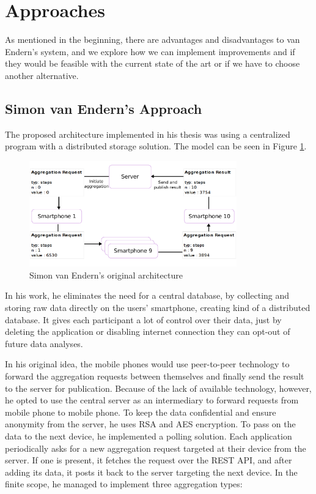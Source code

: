\section{Approaches}
As mentioned in the beginning, there are advantages and disadvantages to van Endern's \cite{simon} system, and we explore how we can implement improvements and if they would be feasible with the current state of the art or if we have to choose another alternative.

\subsection{Simon van Endern's Approach}
The proposed architecture implemented in his thesis was using a centralized program with a distributed storage solution. The model can be seen in Figure \ref{fig:simon_original}.

\begin{figure}[htpb]
  \centering
  \includegraphics[width=0.8\textwidth]{figures/simon_original.png}
  \caption{Simon van Endern's original architecture \cite{simon}} \label{fig:simon_original}
\end{figure}

In his work, he eliminates the need for a central database, by collecting and storing raw data directly on the users' smartphone, creating kind of a distributed database. It gives each participant a lot of control over their data, just by deleting the application or disabling internet connection they can opt-out of future data analyses.

In his original idea, the mobile phones would use peer-to-peer technology to forward the aggregation requests between themselves and finally send the result to the server for publication. Because of the lack of available technology, however, he opted to use the central server as an intermediary to forward requests from mobile phone to mobile phone. To keep the data confidential and ensure anonymity from the server, he uses RSA and AES encryption. To pass on the data to the next device, he implemented a polling solution. Each application periodically asks for a new aggregation request targeted at their device from the server. If one is present, it fetches the request over the REST API, and after adding its data, it posts it back to the server targeting the next device.
In the finite scope, he managed to implement three aggregation types:

